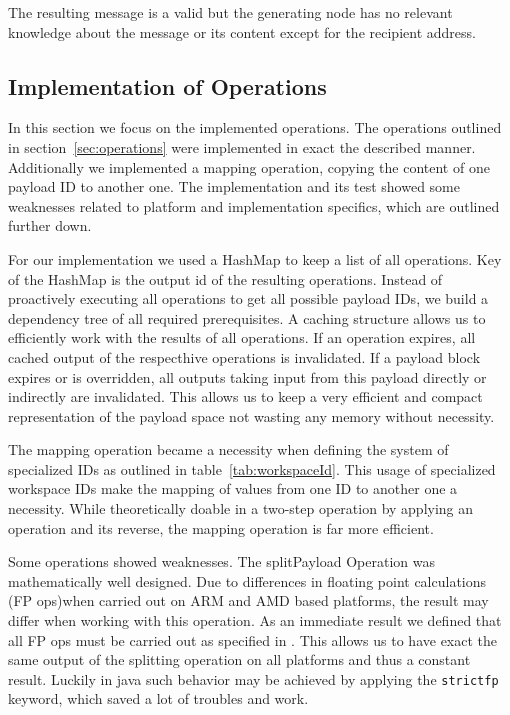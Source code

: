 The resulting message is a valid \VortexMessage but the generating node has no relevant knowledge about the message or its content except for the recipient address.

\subsection{Implementation of Operations\label{sec:implOperations}}
In this section we focus on the implemented operations. The operations outlined in section~\ref{sec:operations} were implemented in exact the described manner. Additionally we implemented a mapping operation, copying the content of one payload ID to another one. The implementation and its test showed some weaknesses related to platform and implementation specifics, which are outlined further down.

For our implementation we used a HashMap to keep a list of all operations. Key of the HashMap is the output id of the resulting operations. Instead of proactively executing all operations to get all possible payload IDs, we build a dependency tree of all required prerequisites. A caching structure allows us to efficiently work with the results of all operations. If an operation expires, all cached output of the respecthive operations is invalidated. If a payload block expires or is overridden, all outputs taking input from this payload directly or indirectly are invalidated. This allows us to keep a very efficient and compact representation of the payload space not wasting any memory without necessity.

The mapping operation became a necessity when defining the system of specialized IDs as outlined in table~\ref{tab:workspaceId}. This usage of specialized workspace IDs make the mapping of values from one  ID to another one a necessity. While theoretically doable in a two-step operation by applying an operation and its reverse, the mapping operation is far more efficient.

Some operations showed weaknesses. The splitPayload Operation was mathematically well designed. Due to differences in floating point calculations (FP ops)when carried out on ARM and AMD based platforms, the result may differ when working with this operation. As an immediate result we defined that all FP ops must be carried out as specified in \cite{IEEE754}. This allows us to have exact the same output of the splitting operation on all platforms and thus a constant result. Luckily in java such behavior may be achieved by applying the \lstinline[columns=fixed,basicstyle={\normalsize}]{strictfp} keyword, which saved a lot of troubles and work.

